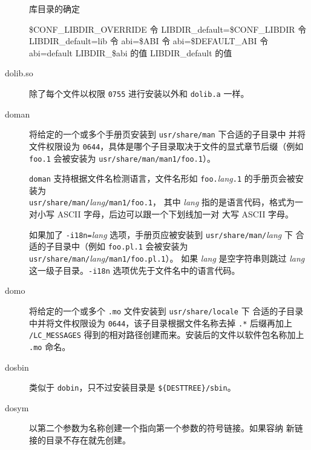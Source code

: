 \begin{description}
\begin{algorithm}
\caption{库目录的确定} \label{alg:ebuild-libdir}
\begin{algorithmic}[1]
    \RETURN \$CONF_LIBDIR_OVERRIDE
\ENDIF
{}
    \STATE 令 LIBDIR_default=\$CONF_LIBDIR
\ELSE
    \STATE 令 LIBDIR_default=lib
\ENDIF
{}
    \STATE 令 abi=\$ABI
    \STATE 令 abi=\$DEFAULT_ABI
\ELSE
    \STATE 令 abi=default
\ENDIF
{}
    \RETURN LIBDIR_\$abi 的值
\ELSE
    \RETURN LIBDIR_default 的值
\ENDIF
\end{algorithmic}
\end{algorithm}

\item[dolib.so] 除了每个文件以权限 \texttt{0755} 进行安装以外和 \texttt{dolib.a} 一样。

\item[doman] 将给定的一个或多个手册页安装到 \texttt{usr/share/man} 下合适的子目录中
    并将文件权限设为 \texttt{0644}，具体是哪个子目录取决于文件的显式章节后缀（例如
    \texttt{foo.1} 会被安装为 \texttt{usr/share/man/man1/foo.1}）。

    \texttt{doman} 支持根据文件名检测语言，文件名形如 \texttt{foo.}\textit{lang}\texttt{.1}
    的手册页会被安装为 \\ \texttt{usr/share/man/}\textit{lang}\texttt{/man1/foo.1}，
    其中 \textit{lang} 指的是语言代码，格式为一对小写 ASCII 字母，后边可以跟一个下划线加一对
    大写 ASCII 字母。

    如果加了 \texttt{-i18n=}\textit{lang} 选项，手册页应被安装到 \texttt{usr/share/man/}\textit{lang} 下
    合适的子目录中（例如 \texttt{foo.pl.1} 会被安装为 \texttt{usr/share/man/}\textit{lang}\texttt{/man1/foo.pl.1}）。
    如果 \textit{lang} 是空字符串则跳过 \textit{lang} 这一级子目录。\texttt{-i18n} 选项优先于文件名中的语言代码。

\item[domo] 将给定的一个或多个 \texttt{.mo} 文件安装到 \texttt{usr/share/locale} 下
    合适的子目录中并将文件权限设为 \texttt{0644}，该子目录根据文件名称去掉 \texttt{.*} 后缀再加上
    \texttt{/LC_MESSAGES} 得到的相对路径创建而来。安装后的文件以软件包名称加上 \texttt{.mo} 命名。

\item[dosbin] 类似于 \texttt{dobin}，只不过安装目录是 \texttt{\$\{DESTTREE\}/sbin}。

\item[dosym] 以第二个参数为名称创建一个指向第一个参数的符号链接。如果容纳
    新链接的目录不存在就先创建。


\end{description}
